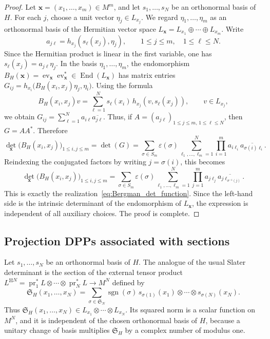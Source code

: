 \documentclass[12pt,a4paper,reqno]{article}
\theoremstyle{thmstyleone}
\theoremstyle{thmstylethree}
\theoremstyle{thmstyletwo}
\numberwithin{equation}{subsection}
\def\leq{\leqslant}
\begin{document}
\begin{proof}
Let $\mathbf x=(x_1,\ldots,x_m)\in M^m$, and let $s_1,\ldots,s_N$ be an orthonormal basis of $H$. For each $j$, choose a unit vector $\eta_j\in L_{x_j}$. We regard $\eta_1,\ldots,\eta_m$ as an orthonormal basis of the Hermitian vector space $L_{\mathbf x}=L_{x_1}\oplus\cdots\oplus L_{x_m}.$ Write
\[
a_{j\ell}=h_{x_j}(s_\ell(x_j),\eta_j),
\qquad 1\leq j\leq m,\quad 1\leq \ell\leq N.
\]
Since the Hermitian product is linear in the first variable, one has $s_\ell(x_j)=a_{j\ell}\eta_j.$ In the basis $\eta_1,\ldots,\eta_m$, the endomorphism $B_H(\mathbf x)=\operatorname{ev}_{\mathbf x}\operatorname{ev}_{\mathbf x}^*\in \operatorname{End}(L_{\mathbf x})$ has matrix entries $G_{ij}=h_{x_i}\bigl(B_H(x_i,x_j)\eta_j,\eta_i\bigr).$ Using the formula
\[
B_H(x_i,x_j)v=\sum_{\ell=1}^Ns_\ell(x_i)\, h_{x_j}(v,s_\ell(x_j)),\qquad v\in L_{x_j},
\]
we obtain $G_{ij}=\sum_{\ell=1}^Na_{i\ell}\overline{a_{j\ell}}.$ Thus, if $A=(a_{j\ell})_{1\leq j\leq m,\,1\leq \ell\leq N}$, then $G=AA^*.$ Therefore
\[
\det_{\mathbf x}\bigl(B_H(x_i,x_j)\bigr)_{1\leq i,j\leq m}
=
\det(G)=
\sum_{\sigma\in S_m}\varepsilon(\sigma)
\sum_{\ell_1,\ldots,\ell_m=1}^N
\prod_{i=1}^m
a_{i\ell_i}\overline{a_{\sigma(i)\ell_i}}.
\]
Reindexing the conjugated factors by writing $j=\sigma(i)$, this becomes
\[
\det_{\mathbf x}\bigl(B_H(x_i,x_j)\bigr)_{1\leq i,j\leq m}
=\sum_{\sigma\in S_m}\varepsilon(\sigma)\sum_{\ell_1,\ldots,\ell_m=1}^N\prod_{j=1}^ma_{j\ell_j}\overline{a_{j\ell_{\sigma^{-1}(j)}}}.
\]
This is exactly the realization~\eqref{eq:Bergman_det_function}. Since the left-hand side is the intrinsic determinant of the endomorphism of $L_{\mathbf x}$, the expression is independent of all auxiliary choices. The proof is complete.
\end{proof}

\subsection{Projection DPPs associated with sections}

Let $s_1,\ldots,s_N$ be an orthonormal basis of $H$. The analogue of the usual Slater determinant is the section of the external tensor product $L^{\boxtimes N}=\operatorname{pr}_1^*L\otimes\cdots\otimes \operatorname{pr}_N^*L\longrightarrow M^N$ defined by
\[
    \mathfrak S_H(x_1,\ldots,x_N)
    =
    \sum_{\sigma\in\mathfrak S_N}
    \operatorname{sgn}(\sigma)\,
    s_{\sigma(1)}(x_1)\otimes\cdots\otimes s_{\sigma(N)}(x_N).
\]
Thus $\mathfrak S_H(x_1,\ldots,x_N)\in L_{x_1}\otimes\cdots\otimes L_{x_N}.$ Its squared norm is a scalar function on $M^N$, and it is independent of the chosen orthonormal basis of $H$, because a unitary change of basis multiplies $\mathfrak S_H$ by a complex number of modulus one.
\end{document}
